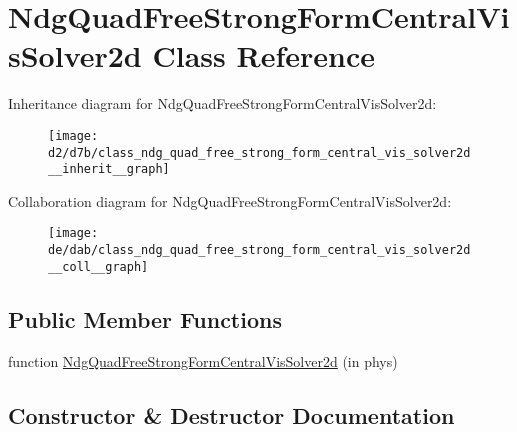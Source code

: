 \hypertarget{class_ndg_quad_free_strong_form_central_vis_solver2d}{}\section{Ndg\+Quad\+Free\+Strong\+Form\+Central\+Vis\+Solver2d Class Reference}
\label{class_ndg_quad_free_strong_form_central_vis_solver2d}


Inheritance diagram for Ndg\+Quad\+Free\+Strong\+Form\+Central\+Vis\+Solver2d\+:
\nopagebreak
\begin{figure}[H]
\begin{center}
\leavevmode
\texttt{[image: d2/d7b/class\_ndg\_quad\_free\_strong\_form\_central\_vis\_solver2d\_\_inherit\_\_graph]}
\end{center}
\end{figure}


Collaboration diagram for Ndg\+Quad\+Free\+Strong\+Form\+Central\+Vis\+Solver2d\+:
\nopagebreak
\begin{figure}[H]
\begin{center}
\leavevmode
\texttt{[image: de/dab/class\_ndg\_quad\_free\_strong\_form\_central\_vis\_solver2d\_\_coll\_\_graph]}
\end{center}
\end{figure}
\subsection*{Public Member Functions}
\begin{DoxyCompactItemize}
\item 
function \hyperlink{class_ndg_quad_free_strong_form_central_vis_solver2d_ad161c8b1265b834cff067dc9e41ecb75}{Ndg\+Quad\+Free\+Strong\+Form\+Central\+Vis\+Solver2d} (in phys)
\end{DoxyCompactItemize}


\subsection{Constructor \& Destructor Documentation}
\mbox{\label{class_ndg_quad_free_strong_form_central_vis_solver2d_ad161c8b1265b834cff067dc9e41ecb75}} 
